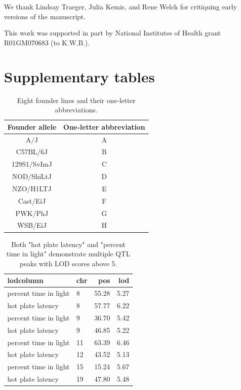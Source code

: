 \documentclass[12pt,twoside, lineno]{gsajnl}
\begin{document}
We thank Lindsay Traeger, Julia Kemis, and Rene Welch for critiquing
early versions of the manuscript.

This work was supported in part by National Institutes of Health grant
R01GM070683 (to K.W.B.). 

\newpage
\appendix
\section{Supplementary tables}


\begin{center}
\begin{table}
\small
  \begin{tabular}{ c | c }
    \hline
    Founder allele & One-letter abbreviation \\ \hline
    A/J & A \\
    C57BL/6J & B \\
    129S1/SvImJ & C \\
    NOD/ShiLtJ & D\\
    NZO/H1LTJ & E\\
    Cast/EiJ & F\\
    PWK/PhJ & G\\
    WSB/EiJ & H\\
    \hline
  \end{tabular}
  \caption{Eight founder lines and their one-letter abbreviations.}
  \label{table-letters}
  \end{table}

\begin{table}[ht]
\begin{tabular}{l|lrr}
  \hline
lodcolumn & chr & pos & lod \\
   \hline
percent time in light & 8 & 55.28 & 5.27 \\
 hot plate latency & 8 & 57.77 & 6.22 \\
 percent time in light & 9 & 36.70 & 5.42 \\
 hot plate latency & 9 & 46.85 & 5.22 \\
 percent time in light & 11 & 63.39 & 6.46 \\
 hot plate latency & 12 & 43.52 & 5.13 \\
 percent time in light & 15 & 15.24 & 5.67 \\
 hot plate latency & 19 & 47.80 & 5.48 \\
   \hline
\end{tabular}
  \caption{Both "hot plate latency" and "percent time in light"
    demonstrate multiple QTL peaks with LOD scores above 5.}
  \label{table-peaks}
\end{table}



\end{center}
\end{document}
